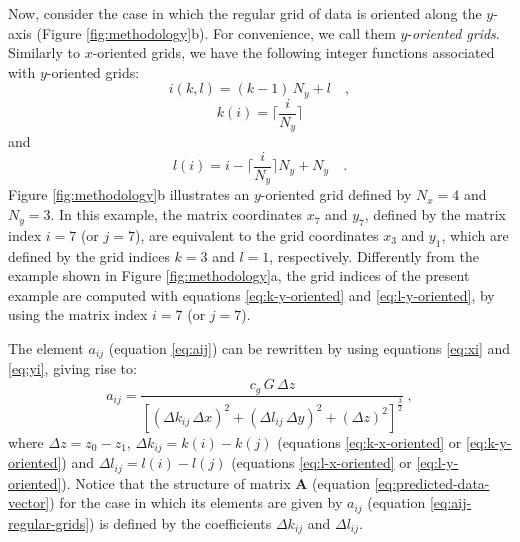 Now, consider the case in which the regular grid of data is oriented along 
the $y$-axis (Figure \ref{fig:methodology}b). For convenience, we call them $y$-\textit{oriented grids}.
Similarly to $x$-oriented grids, we have the following integer functions associated with
$y$-oriented grids:
\begin{equation}
i(k, l) = (k - 1) \, N_{y} + l \quad ,
\label{eq:i-y-oriented}
\end{equation}
\begin{equation}
k(i) = \Bigg\lceil \frac{i}{N_{y}} \Bigg\rceil
\label{eq:k-y-oriented}
\end{equation}
and
\begin{equation}
l(i) = i - \Bigg\lceil \frac{i}{N_{y}} \Bigg\rceil N_{y} + N_{y} \quad .
\label{eq:l-y-oriented}
\end{equation}
Figure \ref{fig:methodology}b illustrates an $y$-oriented grid defined by $N_{x} = 4$ and $N_{y} = 3$.
In this example, the matrix coordinates $x_{7}$ and $y_{7}$, defined by the matrix index 
$i = 7$ (or $j = 7$), are equivalent to the grid coordinates $x_{3}$ and $y_{1}$, which are 
defined by the grid indices $k = 3$ and $l = 1$, respectively. Differently from the example
shown in Figure \ref{fig:methodology}a, the grid indices of the present example are 
computed with equations \ref{eq:k-y-oriented} and \ref{eq:l-y-oriented}, by using the 
matrix index $i = 7$ (or $j = 7$).

The element $a_{ij}$ (equation \ref{eq:aij}) can be rewritten 
by using equations \ref{eq:xi} and \ref{eq:yi}, giving rise to:
\begin{equation}
a_{ij} = \frac{c_{g} \, G \, \Delta z}{ \left[ 
	\left( \Delta k_{ij} \, \Delta x \right)^{2} + 
	\left( \Delta l_{ij} \, \Delta y \right)^{2} + 
	\left( \Delta z \right)^{2} \right]^{\frac{3}{2}}} \: ,
\label{eq:aij-regular-grids}
\end{equation}
where $\Delta z = z_{0} - z_{1}$, 
$\Delta k_{ij} = k(i) - k(j)$ (equations \ref{eq:k-x-oriented} or \ref{eq:k-y-oriented}) and
$\Delta l_{ij} = l(i) - l(j)$ (equations \ref{eq:l-x-oriented} or \ref{eq:l-y-oriented}).
Notice that the structure of matrix $\mathbf{A}$ (equation \ref{eq:predicted-data-vector}) for 
the case in which its elements are given by $a_{ij}$ (equation \ref{eq:aij-regular-grids}) is 
defined by the coefficients $\Delta k_{ij}$ and $\Delta l_{ij}$.

